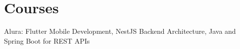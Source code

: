 \section{Courses}
{\small Alura: Flutter Mobile Development, NestJS Backend Architecture, Java and Spring Boot for REST APIs}
